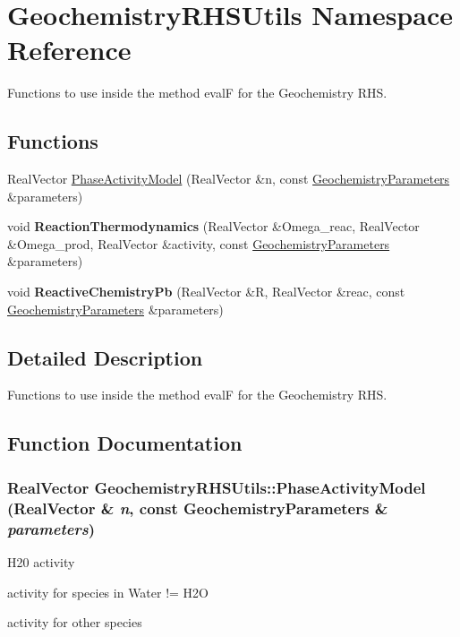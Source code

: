 \hypertarget{namespaceGeochemistryRHSUtils}{
\section{GeochemistryRHSUtils Namespace Reference}
\label{namespaceGeochemistryRHSUtils}
}


Functions to use inside the method evalF for the Geochemistry RHS.  
\subsection*{Functions}
\begin{DoxyCompactItemize}
\item 
RealVector \hyperlink{namespaceGeochemistryRHSUtils_a84ce122e6af2eaef808c5c9c981cddaf}{PhaseActivityModel} (RealVector \&n, const \hyperlink{classGeochemistryParameters}{GeochemistryParameters} \&parameters)
\item 
\hypertarget{namespaceGeochemistryRHSUtils_a4df588a263eb5854d4cd02f6716cab2c}{
void {\bfseries ReactionThermodynamics} (RealVector \&Omega\_\-reac, RealVector \&Omega\_\-prod, RealVector \&activity, const \hyperlink{classGeochemistryParameters}{GeochemistryParameters} \&parameters)}
\label{namespaceGeochemistryRHSUtils_a4df588a263eb5854d4cd02f6716cab2c}

\item 
\hypertarget{namespaceGeochemistryRHSUtils_a00f20db741aa301f7d5851a689af38af}{
void {\bfseries ReactiveChemistryPb} (RealVector \&R, RealVector \&reac, const \hyperlink{classGeochemistryParameters}{GeochemistryParameters} \&parameters)}
\label{namespaceGeochemistryRHSUtils_a00f20db741aa301f7d5851a689af38af}

\end{DoxyCompactItemize}


\subsection{Detailed Description}
Functions to use inside the method evalF for the Geochemistry RHS. 

\subsection{Function Documentation}
\hypertarget{namespaceGeochemistryRHSUtils_a84ce122e6af2eaef808c5c9c981cddaf}{
\subsubsection[{PhaseActivityModel}]{\setlength{\rightskip}{0pt plus 5cm}RealVector GeochemistryRHSUtils::PhaseActivityModel (RealVector \& {\em n}, \/  const {\bf GeochemistryParameters} \& {\em parameters})}}
\label{namespaceGeochemistryRHSUtils_a84ce122e6af2eaef808c5c9c981cddaf}


H20 activity

activity for species in Water != H2O

activity for other species